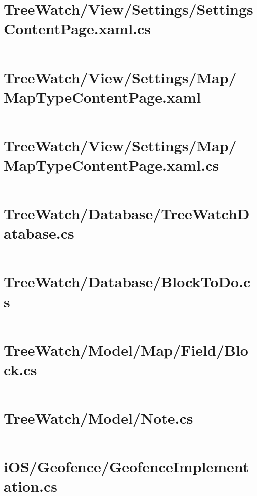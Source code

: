 \documentclass[12pt]{article}
\begin{document}
\pagebreak\section{TreeWatch/View/Settings/SettingsContentPage.xaml.cs}
\inputminted[linenos,firstline=22]{csharp}{../../../src/TreeWatch/View/Settings/SettingsContentPage.xaml.cs}

\pagebreak\section{TreeWatch/View/Settings/Map/ MapTypeContentPage.xaml}
\inputminted[linenos]{xml}{../../../src/TreeWatch/View/Settings/Map/MapTypeContentPage.xaml}

\pagebreak\section{TreeWatch/View/Settings/Map/ MapTypeContentPage.xaml.cs}
\inputminted[linenos,firstline=22]{csharp}{../../../src/TreeWatch/View/Settings/Map/MapTypeContentPage.xaml.cs}

\pagebreak\section{TreeWatch/Database/TreeWatchDatabase.cs}
\inputminted[linenos,firstline=22]{csharp}{../../../src/TreeWatch/Database/TreeWatchDatabase.cs}

\pagebreak\section{TreeWatch/Database/BlockToDo.cs}
\inputminted[linenos,firstline=22]{csharp}{../../../src/TreeWatch/Database/BlockToDo.cs}

\pagebreak\section{TreeWatch/Model/Map/Field/Block.cs}
\inputminted[firstline=53,lastline=80]{csharp}{../../../src/TreeWatch/Model/Map/Field/Block.cs}

\pagebreak\section{TreeWatch/Model/Note.cs}
\inputminted[firstline=81,lastline=93]{csharp}{../../../src/TreeWatch/Model/Note.cs}

\pagebreak\section{iOS/Geofence/GeofenceImplementation.cs}
\inputminted[linenos,firstline=184]{csharp}{../../../src/iOS/Geofence/GeofenceImplementation.cs}
\end{document}
